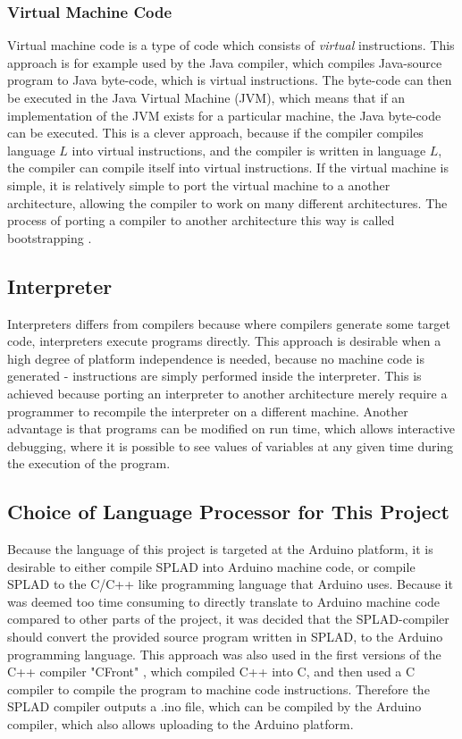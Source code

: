 \subsubsection{Virtual Machine Code} 
Virtual machine code is a type of code which consists of \emph{virtual} instructions. This approach is for example used by the Java compiler, which compiles Java-source program to Java byte-code, which is virtual instructions. The byte-code can then be executed in the Java Virtual Machine (JVM), which means that if an implementation of the JVM exists for a particular machine, the Java byte-code can be executed. This is a clever approach, because if the compiler compiles language $L$ into virtual instructions, and the compiler is written in language $L$, the compiler can compile itself into virtual instructions. If the virtual machine is simple, it is relatively simple to port the virtual machine to a another architecture, allowing the compiler to work on many different architectures. The process of porting a compiler to another architecture this way is called bootstrapping \citep{CraftingACompiler}. 

\subsection{Interpreter}
Interpreters differs from compilers because where compilers generate some target code, interpreters execute programs directly. This approach is desirable when a high degree of platform independence is needed, because no machine code is generated - instructions are simply performed inside the interpreter. This is achieved because porting an interpreter to another architecture merely require a programmer to recompile the interpreter on a different machine. Another advantage is that programs can be modified on run time, which allows interactive debugging, where it is possible to see values of variables at any given time during the execution of the program. 

\subsection{Choice of Language Processor for This Project}
Because the language of this project is targeted at the Arduino platform, it is desirable to either compile SPLAD into Arduino machine code, or compile SPLAD to the C/C++ like programming language that Arduino uses. Because it was deemed too time consuming to directly translate to Arduino machine code compared to other parts of the project, it was decided that the SPLAD-compiler should convert the provided source program written in SPLAD, to the Arduino programming language. This approach was also used in the first versions of the C++ compiler "CFront" \citep{sebesta}, which compiled C++ into C, and then used a C compiler to compile the program to machine code instructions. Therefore the SPLAD compiler outputs a .ino file, which can be compiled by the Arduino compiler, which also allows uploading to the Arduino platform. 